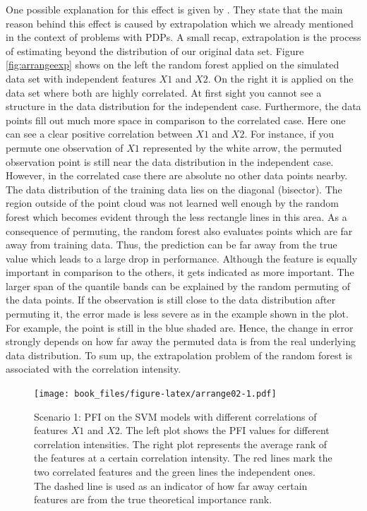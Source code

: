 \documentclass[
]{krantz}
\begin{document}
One possible explanation for this effect is given by \citet{hooker2019}. They state that the main reason behind this effect is caused by extrapolation which we already mentioned in the context of problems with PDPs. A small recap, extrapolation is the process of estimating beyond the distribution of our original data set. Figure \ref{fig:arrangeexp} shows on the left the random forest applied on the simulated data set with independent features \(X1\) and \(X2\). On the right it is applied on the data set where both are highly correlated. At first sight you cannot see a structure in the data distribution for the independent case. Furthermore, the data points fill out much more space in comparison to the correlated case. Here one can see a clear positive correlation between \(X1\) and \(X2\). For instance, if you permute one observation of \(X1\) represented by the white arrow, the permuted observation point is still near the data distribution in the independent case. However, in the correlated case there are absolute no other data points nearby. The data distribution of the training data lies on the diagonal (bisector). The region outside of the point cloud was not learned well enough by the random forest which becomes evident through the less rectangle lines in this area. As a consequence of permuting, the random forest also evaluates points which are far away from training data. Thus, the prediction can be far away from the true value which leads to a large drop in performance. Although the feature is equally important in comparison to the others, it gets indicated as more important. The larger span of the quantile bands can be explained by the random permuting of the data points. If the observation is still close to the data distribution after permuting it, the error made is less severe as in the example shown in the plot. For example, the point is still in the blue shaded are. Hence, the change in error strongly depends on how far away the permuted data is from the real underlying data distribution. To sum up, the extrapolation problem of the random forest is associated with the correlation intensity.

\begin{figure}
\centering
\texttt{[image: book\_files/figure-latex/arrange02-1.pdf]}
\caption{\label{fig:arrange02}Scenario 1: PFI on the SVM models with different correlations of features \(X1\) and \(X2\). The left plot shows the PFI values for different correlation intensities. The right plot represents the average rank of the features at a certain correlation intensity. The red lines mark the two correlated features and the green lines the independent ones. The dashed line is used as an indicator of how far away certain features are from the true theoretical importance rank.}
\end{figure}
\end{document}
